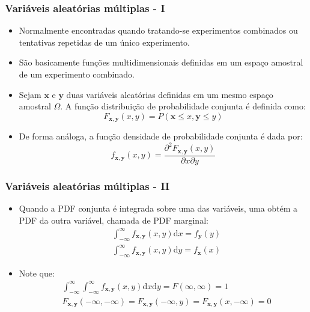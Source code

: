\begin{frame}
    \frametitle{Variáveis aleatórias múltiplas - I}

    \begin{itemize}
     \item Normalmente encontradas quando tratando-se experimentos combinados ou tentativas repetidas de um único experimento.
      \item São basicamente funções multidimensionais definidas em um espaço amostral de um experimento combinado.
      \item Sejam $\mathbf{x}$ e $\mathbf{y}$ duas variáveis aleatórias definidas em um mesmo espaço amostral $\Omega$. A função distribuição de probabilidade conjunta é definida como:
      \begin{equation}
	  F_{\mathbf{x},\mathbf{y}} (x, y) = P(\mathbf{x} \leq x, \mathbf{y} \leq y)
      \end{equation}
      \item De forma análoga, a função densidade de probabilidade conjunta é dada por:
      \begin{equation}
	  f_{\mathbf{x},\mathbf{y}} (x, y) = \frac{\partial^2 F_{\mathbf{x},\mathbf{y}} (x, y)}{\partial x \partial y}
      \end{equation}
    
    \end{itemize}

\end{frame}

\begin{frame}
    \frametitle{Variáveis aleatórias múltiplas - II}

    \begin{itemize}
     \item Quando a PDF conjunta é integrada sobre uma das variáveis, uma obtém a PDF da outra variável, chamada de PDF marginal:
      \begin{align}
	  & \int_{-\infty}^{\infty} f_{\mathbf{x},\mathbf{y}} (x, y) \textrm{d}x = f_{\mathbf{y}}(y) \\
	  & \int_{-\infty}^{\infty} f_{\mathbf{x},\mathbf{y}} (x, y) \textrm{d}y = f_{\mathbf{x}}(x)
      \end{align}
      \item Note que:
      \begin{align}
	  & \int_{-\infty}^{\infty}\int_{-\infty}^{\infty} f_{\mathbf{x},\mathbf{y}} (x, y) \textrm{d}x\textrm{d}y = F(\infty, \infty) = 1 \\
	  & F_{\mathbf{x},\mathbf{y}}(-\infty,-\infty) = F_{\mathbf{x},\mathbf{y}}(-\infty,y) = F_{\mathbf{x},\mathbf{y}}(x,-\infty) = 0
      \end{align}
    
    \end{itemize}

\end{frame}

